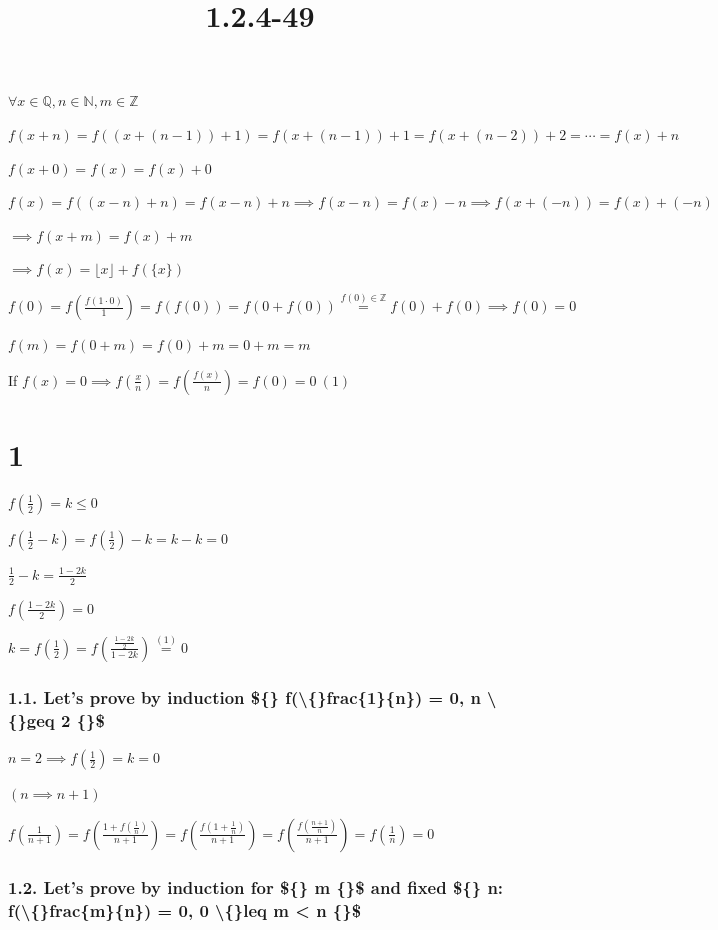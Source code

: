 \documentclass{article}
\title{1.2.4-49}
\begin{document}
\maketitle

$\forall x \in \mathbb{Q}, n \in \mathbb{N}, m \in \mathbb{Z}$

$f(x+n) = f((x+(n-1))+1) = f(x+(n-1)) + 1 = f(x+(n-2)) + 2 = \cdots = f(x) + n$

$f(x+0) = f(x) = f(x) + 0$

$f(x) = f((x-n)+n) = f(x-n) + n \implies f(x-n) = f(x) - n \implies f(x+(-n)) = f(x) + (-n)$

$\implies f(x+m) = f(x) + m$

$\implies f(x) = \lfloor{x}\rfloor + f(\{ x \})$

$f(0) = f(\frac{f(1 \cdot 0)}{1}) = f(f(0)) = f(0 + f(0)) \overset{f(0) \in \mathbb{Z}}{=} f(0) + f(0) \implies f(0) = 0$

$f(m) = f(0+m) = f(0) + m = 0 + m = m$

If $f(x) = 0 \implies f(\frac{x}{n}) = f(\frac{f(x)}{n}) = f(0) = 0\ (1)$

\section*{1}

$f(\frac{1}{2}) = k \leq 0$

$f(\frac{1}{2}-k) = f(\frac{1}{2}) - k = k - k = 0$

$\frac{1}{2} - k = \frac{1-2k}{2}$

$f(\frac{1-2k}{2}) = 0$

$k = f(\frac{1}{2}) = f(\frac{\frac{1-2k}{2}}{1-2k}) \overset{(1)}{=} 0$

\subsubsection*{1.1. Let's prove by induction \$\{\} f(\textbackslash\{\}frac\{1\}\{n\}) = 0, n \textbackslash\{\}geq 2 \{\}\$}

$n = 2 \implies f(\frac{1}{2}) = k = 0$

$(n \implies n + 1)$

$f(\frac{1}{n+1}) = f(\frac{1+f(\frac{1}{n})}{n+1}) = f(\frac{f(1+\frac{1}{n})}{n+1}) = f(\frac{f(\frac{n+1}{n})}{n+1}) = f(\frac{1}{n}) = 0$

\subsubsection*{1.2. Let's prove by induction for \$\{\} m \{\}\$ and fixed \$\{\} n: f(\textbackslash\{\}frac\{m\}\{n\}) = 0, 0 \textbackslash\{\}leq m < n \{\}\$}
\end{document}
